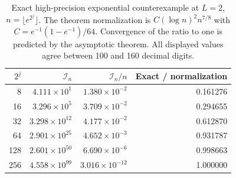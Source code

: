 \begin{table}[t]
\centering\footnotesize
\caption{Exact high-precision exponential counterexample at $L=2$, $n=\lfloor e^{2^j}\rfloor$. The theorem normalization is $C(\log n)^2 n^{7/8}$ with $C=e^{-1}(1-e^{-1})/64$. Convergence of the ratio to one is predicted by the asymptotic theorem. All displayed values agree between 100 and 160 decimal digits.}\label{tab:revision-exponential}
\begin{tabular}{@{}rrrr@{}}\toprule
$2^j$ & $\mathcal I_n$ & $\mathcal I_n/n$ & Exact / normalization\\\midrule
8 & $4.111\times10^{1}$ & $1.380\times10^{-2}$ & 0.161276\\
16 & $3.296\times10^{5}$ & $3.709\times10^{-2}$ & 0.294655\\
32 & $3.298\times10^{12}$ & $4.177\times10^{-2}$ & 0.612870\\
64 & $2.901\times10^{25}$ & $4.652\times10^{-3}$ & 0.931787\\
128 & $2.601\times10^{50}$ & $6.690\times10^{-6}$ & 0.998663\\
256 & $4.558\times10^{99}$ & $3.016\times10^{-12}$ & 1.000000\\
\bottomrule\end{tabular}
\end{table}
